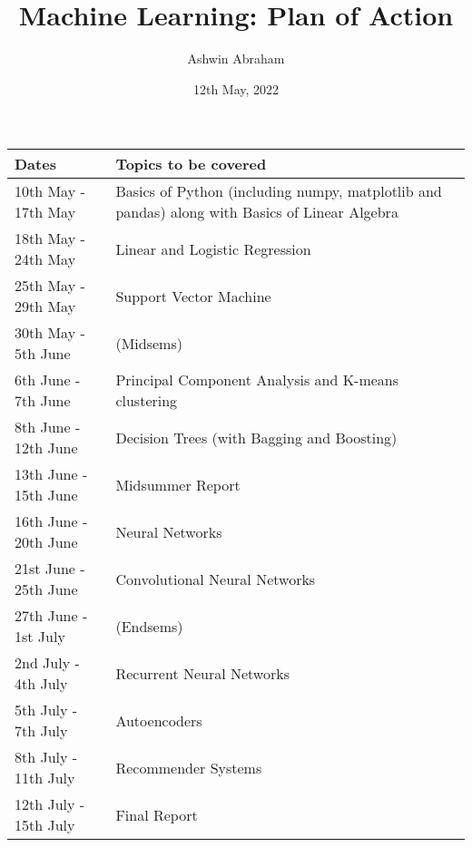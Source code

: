 \documentclass{article}
\title{Machine Learning: Plan of Action}
\author{Ashwin Abraham}
\date{12th May, 2022}
\begin{document}
    \maketitle

    \section*{}
    \begin{center}
        \begin{tabularx}{0.8\textwidth}
            {
                |>{\centering\arraybackslash}X 
                |>{\centering\arraybackslash}X
                |>{\centering\arraybackslash}X
            }
            \hline
                \textbf{Dates} & \textbf{Topics to be covered} \\
            \hline
                10th May - 17th May & Basics of Python (including numpy, matplotlib and pandas) along with Basics of Linear Algebra  \\
            \hline
                18th May - 24th May & Linear and Logistic Regression \\
            \hline
                25th May - 29th May & Support Vector Machine \\
            \hline
                30th May - 5th June & (Midsems) \\
            \hline
                6th June - 7th June & Principal Component Analysis and K-means clustering \\
            \hline
                8th June - 12th June & Decision Trees (with Bagging and Boosting) \\
            \hline
                13th June - 15th June & Midsummer Report \\
            \hline
                16th June - 20th June & Neural Networks \\
            \hline
                21st June - 25th June & Convolutional Neural Networks \\
            \hline
                27th June - 1st July & (Endsems) \\
            \hline
                2nd July - 4th July & Recurrent Neural Networks \\
            \hline
                5th July - 7th July & Autoencoders \\
            \hline
                8th July - 11th July & Recommender Systems \\
            \hline
                12th July - 15th July & Final Report \\
            \hline
        \end{tabularx}
    \end{center}
    
\end{document}
